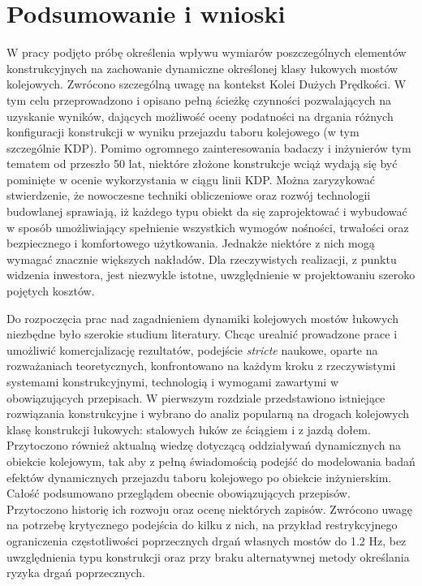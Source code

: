 \chapter*{Podsumowanie i wnioski}

W pracy podjęto próbę określenia wpływu wymiarów poszczególnych elementów konstrukcyjnych na zachowanie dynamiczne określonej klasy łukowych mostów kolejowych. Zwrócono szczególną uwagę na kontekst Kolei Dużych Prędkości. W tym celu przeprowadzono i opisano pełną ścieżkę czynności pozwalających na uzyskanie wyników, dających możliwość oceny podatności na drgania różnych konfiguracji konstrukcji w wyniku przejazdu taboru kolejowego (w tym szczególnie KDP). Pomimo ogromnego zainteresowania badaczy i inżynierów tym tematem od przeszło 50 lat, niektóre złożone konstrukcje wciąż wydają się być pominięte w ocenie wykorzystania w ciągu linii KDP. Można zaryzykować stwierdzenie, że nowoczesne techniki obliczeniowe oraz rozwój technologii budowlanej sprawiają, iż każdego typu obiekt da się zaprojektować i wybudować w sposób umożliwiający spełnienie wszystkich wymogów nośności, trwałości oraz bezpiecznego i komfortowego użytkowania. Jednakże niektóre z nich mogą wymagać znacznie większych nakładów. Dla rzeczywistych realizacji, z punktu widzenia inwestora, jest niezwykle istotne, uwzględnienie w projektowaniu  szeroko pojętych kosztów.

Do rozpoczęcia prac nad zagadnieniem dynamiki kolejowych mostów łukowych niezbędne było szerokie studium literatury. Chcąc urealnić prowadzone prace i umożliwić komercjalizację rezultatów, podejście \textit{stricte} naukowe, oparte na rozważaniach teoretycznych, konfrontowano na każdym kroku z rzeczywistymi systemami konstrukcyjnymi, technologią i wymogami zawartymi w obowiązujących przepisach. W pierwszym rozdziale przedstawiono istniejące rozwiązania konstrukcyjne i wybrano do analiz popularną na drogach kolejowych klasę konstrukcji łukowych: stalowych łuków ze ściągiem i z jazdą dołem. Przytoczono również aktualną wiedzę dotyczącą oddziaływań dynamicznych na obiekcie kolejowym, tak aby z pełną świadomością podejść do modelowania badań efektów dynamicznych przejazdu taboru kolejowego po obiekcie inżynierskim. Całość podsumowano przeglądem obecnie obowiązujących przepisów. Przytoczono historię ich rozwoju oraz ocenę niektórych zapisów. Zwrócono uwagę na potrzebę krytycznego podejścia do kilku z nich, na przykład restrykcyjnego ograniczenia częstotliwości poprzecznych drgań własnych mostów do 1.2 Hz, bez uwzględnienia typu konstrukcji oraz przy braku alternatywnej metody określania ryzyka drgań poprzecznych.

